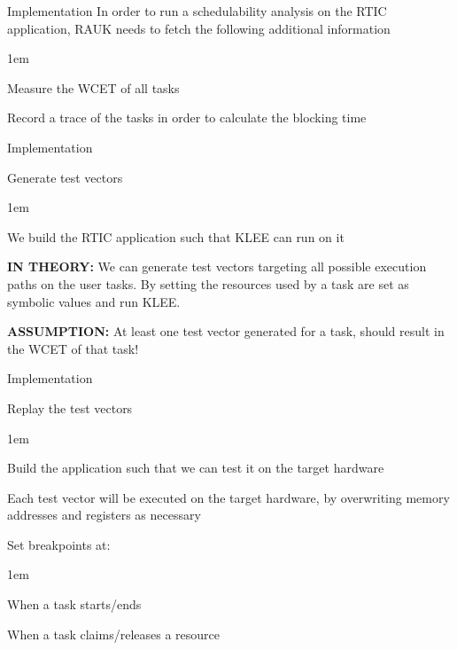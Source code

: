 \begin{frame}{Implementation}
    In order to run a schedulability analysis on the RTIC application,
    RAUK needs to fetch the following additional information
    \vspace{1em}
    \begin{itemize-size}{1em}
        \item Measure the WCET of all tasks
        \item Record a trace of the tasks in order to
        calculate the blocking time
    \end{itemize-size}     
\end{frame}

\begin{frame}{Implementation}
    \begin{block}{Generate test vectors}
        \begin{itemize-size}{1em}
            \item We build the RTIC application such that KLEE can run on it
            \item \textbf{IN THEORY:} We can generate test vectors targeting all possible
            execution paths on the user tasks. By setting the resources used by a task
            are set as symbolic values and run KLEE.
            \item \textbf{ASSUMPTION:} At least one test vector generated for a task, should
            result in the WCET of that task!
        \end{itemize-size}  
    \end{block}
\end{frame}

\begin{frame}{Implementation}
    \begin{block}{Replay the test vectors}
        \begin{itemize-size}{1em}
            \item Build the application such that we can test it on the target hardware
            \item Each test vector will be executed on the target hardware, by overwriting
            memory addresses and registers as necessary
            \item Set breakpoints at:
            \begin{itemize-size}{1em}
                \vspace{0.5em}
                \item When a task starts/ends
                \item When a task claims/releases a resource
            \end{itemize-size}
        \end{itemize-size}  
    \end{block}
\end{frame}

